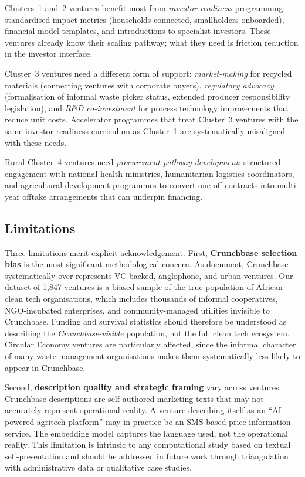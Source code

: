 \documentclass[review,12pt]{elsarticle}
\begin{document}
Clusters~1 and~2 ventures benefit most from
\textit{investor-readiness} programming: standardised impact metrics
(households connected, smallholders onboarded), financial model
templates, and introductions to specialist investors. These ventures
already know their scaling pathway; what they need is friction
reduction in the investor interface.

Cluster~3 ventures need a different form of support:
\textit{market-making} for recycled materials (connecting ventures
with corporate buyers), \textit{regulatory advocacy} (formalisation
of informal waste picker status, extended producer responsibility
legislation), and \textit{R\&D co-investment} for process technology
improvements that reduce unit costs. Accelerator programmes that
treat Cluster~3 ventures with the same investor-readiness curriculum
as Cluster~1 are systematically misaligned with these needs.

Rural Cluster~4 ventures need \textit{procurement pathway
development}: structured engagement with national health ministries,
humanitarian logistics coordinators, and agricultural development
programmes to convert one-off contracts into multi-year offtake
arrangements that can underpin financing.

\subsection{Limitations}

Three limitations merit explicit acknowledgement. First,
\textbf{Crunchbase selection bias} is the most significant
methodological concern. As \citet{rodriguez2021crunchbase} document,
Crunchbase systematically over-represents VC-backed, anglophone, and
urban ventures. Our dataset of 1,847 ventures is a biased sample of
the true population of African clean tech organisations, which
includes thousands of informal cooperatives, NGO-incubated enterprises,
and community-managed utilities invisible to Crunchbase. Funding and
survival statistics should therefore be understood as describing the
\textit{Crunchbase-visible} population, not the full clean tech
ecosystem. Circular Economy ventures are particularly affected, since
the informal character of many waste management organisations makes
them systematically less likely to appear in Crunchbase.

Second, \textbf{description quality and strategic framing} vary across
ventures. Crunchbase descriptions are self-authored marketing texts
that may not accurately represent operational reality. A venture
describing itself as an ``AI-powered agritech platform'' may in
practice be an SMS-based price information service. The embedding
model captures the language used, not the operational reality. This
limitation is intrinsic to any computational study based on textual
self-presentation and should be addressed in future work through
triangulation with administrative data or qualitative case studies.
\end{document}
